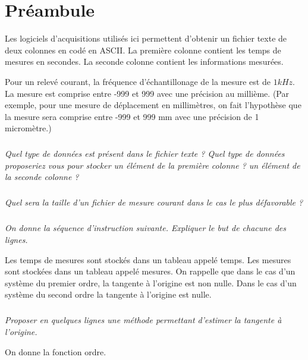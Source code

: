 \documentclass[10pt]{article}
\newif\ifxp
\begin{document}
\ifxp

\else

\fi



 \renewcommand{\baselinestretch}{1.2}
\setlength{\parskip}{2ex plus 0.5ex minus 0.2ex}



\section{Préambule}
Les logiciels d'acquisitions utilisés ici permettent d'obtenir un fichier texte de deux colonnes en codé en ASCII. La première colonne contient les temps de mesures en secondes. La seconde colonne contient les informations mesurées. 

Pour un relevé courant, la fréquence d'échantillonage de la mesure est de $1 kHz$. La mesure est comprise entre -999 et 999 avec une précision au millième. (Par exemple, pour une mesure de déplacement en millimètres, on fait l'hypothèse que la mesure sera comprise entre -999 et 999 mm avec une précision de 1 micromètre.)


\subparagraph{}
\textit{Quel type de données est présent dans le fichier texte ? Quel type de données proposeriez vous pour stocker un élément de la première colonne ? un élément de la seconde colonne ?}

\subparagraph{}
\textit{Quel sera la taille d'un fichier de mesure courant dans le cas le plus défavorable ?}

\subparagraph{}
\textit{On donne la séquence d'instruction suivante. Expliquer le but de chacune des lignes.}
\begin{py}
\begin{python}
\end{python}
\end{py}

Les temps de mesures sont stockés dans un tableau appelé \textsf{temps}. Les mesures sont stockées dans un tableau appelé \textsf{mesures}. On rappelle que dans le cas d'un système du premier ordre, la tangente à l'origine est non nulle. Dans le cas d'un système du second ordre la tangente à l'origine est nulle.


\subparagraph{}
\textit{Proposer en quelques lignes une méthode permettant d'estimer la tangente à l'origine.}
 
 
 On donne la fonction \textsf{ordre}. 
\begin{py}
\begin{python}
\end{python}
\end{py}
 
\end{document}
